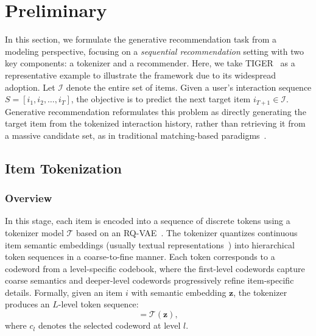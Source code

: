 \section{Preliminary}

In this section, we formulate the generative recommendation task from a modeling perspective, focusing on a \emph{sequential recommendation} setting with two key components: a tokenizer and a recommender. Here, we take TIGER~\cite{TIGER} as a representative example to illustrate the framework due to its widespread adoption. Let $\mathcal{I}$ denote the entire set of items. Given a user's interaction sequence $S = [i_1, i_2, \ldots, i_T]$, the objective is to predict the next target item $i_{T+1} \in \mathcal{I}$. Generative recommendation reformulates this problem as directly generating the target item from the tokenized interaction history, rather than retrieving it from a massive candidate set, as in traditional matching-based paradigms~\cite{SASRec}.

\subsection{Item Tokenization}
\subsubsection{Overview}
In this stage, each item is encoded into a sequence of discrete tokens using a tokenizer model $\mathcal{T}$ based on an RQ-VAE~\cite{RQ-VAE}. The tokenizer quantizes continuous item semantic embeddings (\eg usually textual representations~\cite{TIGER,LETTER}) into hierarchical token sequences in a coarse-to-fine manner. Each token corresponds to a codeword from a level-specific codebook, where the first-level codewords capture coarse semantics and deeper-level codewords progressively refine item-specific details.
Formally, given an item $i$ with semantic embedding $\bm{z}$, the tokenizer produces an $L$-level token sequence:
\begin{equation}
[c_1, \ldots, c_L] = \mathcal{T}(\bm{z}),
\end{equation}
where $c_l$ denotes the selected codeword at level $l$.

